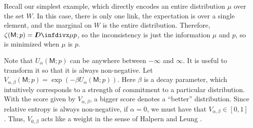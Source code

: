 \documentclass{article}
\newcommand{\sfM}{\mathsf M}
\numberwithin{equation}{section}
\begin{document}
	
	\begin{example}[continues=ex:worldsonly]
		Recall our simplest example, which directly encodes an entire distribution $\mu$ over the set $W$. 
		In this case, there is only one link, the expectation
                is over a single element, and the marginal on $W$ is
                the entire distribution. Therefore, $\zeta(\sfM; p) =
                \kldiv{\mu}{p}$, so the inconsistency is just the information $\mu$ and $p$, so is minimized when $\mu$ is $p$.
	\end{example}

Note that $U_\alpha(\sfM; p)$ can be anywhere between $-\infty$ and
$\infty$.  It is useful to transform it so that it is always
non-negative.
Let $V_{\alpha,\beta}(\sfM;p) = \exp(-\beta U_\alpha(\sfM;p) ) $.  Here
  $\beta$ is a decay parameter,
  which intuitively corresponds to a strength of
        commitment to a particular distribution. 
With the score given by $V_{\alpha,\beta}$, a bigger score denotes a
``better'' distribution.  Since relative entropy is always
non-negative, if $\alpha=0$, we must have that $V_{\alpha,\beta} \in
  [0,1]$.  Thus, $V_{0,\beta}$ acts like a weight in the sense of
  Halpern and Leung \citeyear{halpern2015weighted}.
\end{document}
